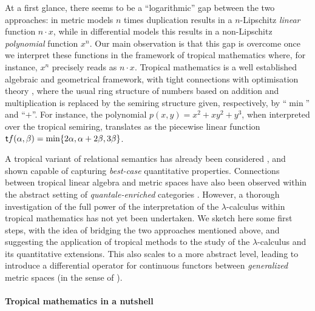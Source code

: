 \documentclass[submission,%
]{eptcs}
\begin{document}
At a first glance, there seems to be a  ``logarithmic'' gap between the two approaches:
in metric models $n$ times duplication results in a $n$-Lipschitz \emph{linear} function $n\cdot x$, while in differential models this results in a non-Lipschitz \emph{polynomial} function $x^{n}$.
Our main observation is that 
this gap is overcome once we interpret these functions in the framework of tropical mathematics where, for instance, $x^{n}$ precisely reads as $n\cdot x$.
Tropical mathematics \cite{Simon} is a well established algebraic and geometrical framework, with tight connections with optimisation theory \cite{Sturmfelds}, where the usual ring structure of numbers based on addition and multiplication is replaced by the semiring structure given, respectively, by ``$\min$'' and ``$+$''.
For instance, the polynomial $p(x,y)=x^{2}+xy^{2}+y^{3}$, when interpreted over the tropical semiring, translates as the piecewise linear function
$
\mathsf{t} f(\alpha,\beta)=\min\{2\alpha, \alpha+2\beta, 3\beta\}
$.

A tropical variant of relational semantics has already been considered \cite{Manzo2013}, and shown capable of capturing \emph{best-case} quantitative properties.
Connections between tropical linear algebra and metric spaces have also been observed \cite{Fuji} within the abstract setting of \emph{quantale-enriched} categories \cite{Hofmann2014, Stubbe2014}.
However, a thorough investigation of the full power of the interpretation of the $\lambda$-calculus within tropical mathematics has not yet been undertaken.
We sketch here some first steps, with the idea of bridging the two approaches mentioned above, and suggesting the application of tropical methods to the study of the $\lambda$-calculus and its quantitative extensions.
This also scales to a 
more abstract level, leading to introduce a differential operator for continuous functors between \emph{generalized} metric spaces (in the sense of \cite{Lawvere1973}).

\paragraph{Tropical mathematics in a nutshell}
\end{document}
